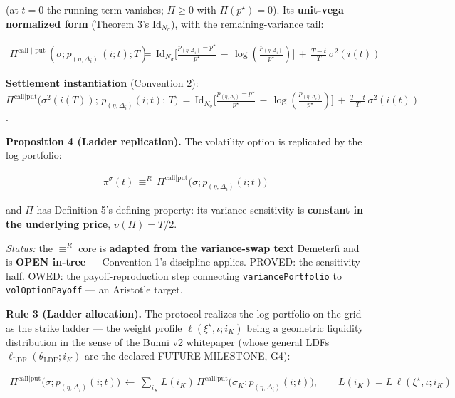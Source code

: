 \documentclass[11pt]{article}
\renewcommand{\_}{\textunderscore\allowbreak}
\begin{document}
(at \(t=0\) the running term vanishes; \(\Pi \geq 0\) with \(\Pi(p^{\star}) = 0\)). Its \textbf{unit-vega normalized form} (Theorem 3's \(\text{Id}_{N_\sigma}\)), with the remaining-variance tail:

\[
    \begin{aligned}
        \Pi^{\text{call | put}} \, (\sigma ;p_{(\eta, \Delta_i)} \, (i; t); T) \, &= \, \text{Id}_{ N_{\sigma}} \Big [\frac{p_{(\eta, \Delta_i)} - p^{\star}}{p^{\star}} \, - \, \log (\frac{p_{(\eta, \Delta_i)}}{p^{\star}})\Big] \, + \, \frac{T - t}{T}\, \sigma^2(i(t))
    \end{aligned}
\]

\textbf{Settlement instantiation} (Convention 2): \(\Pi^{\text{call|put}}\big(\sigma^2(i(T));\, p_{(\eta,\Delta_i)}(i;t);\, T\big) \, = \, \text{Id}_{ N_{\sigma}} \Big [\frac{p_{(\eta, \Delta_i)} - p^{\star}}{p^{\star}} \, - \, \log (\frac{p_{(\eta, \Delta_i)}}{p^{\star}})\Big] \, + \, \frac{T - t}{T}\, \sigma^2(i(t))\).

\textbf{Proposition 4 (Ladder replication).} The volatility option is replicated by the log portfolio:

\[
    \begin{aligned}
        \pi^{\sigma}(t) \, \equiv^{R} \, \Pi^{\text{call|put}}\big(\sigma; p_{(\eta,\Delta_i)}(i;t)\big)
    \end{aligned}
\]

and \(\Pi\) has Definition 5's defining property: its variance sensitivity is \textbf{constant in the underlying price}, \(\upsilon(\Pi) = T/2\).

\emph{Status:} the \(\equiv^R\) core is \textbf{adapted from the variance-swap text} \href{../refs/DemeterfietalVarianceSwaps.pdf}{Demeterfi} and is \textbf{OPEN in-tree} --- Convention 1's discipline applies. PROVED: the sensitivity half. OWED: the payoff-reproduction step connecting \texttt{variancePortfolio} to \texttt{volOptionPayoff} --- an Aristotle target.

\textbf{Rule 3 (Ladder allocation).} The protocol realizes the log portfolio on the grid as the strike ladder --- the weight profile \(\ell(\xi^{\star},\iota;i_K)\) being a geometric liquidity distribution in the sense of the \href{../refs/bunni-v2.pdf}{Bunni v2 whitepaper} (whose general LDFs \(\ell_{\text{LDF}}(\theta_{\text{LDF}};i_K)\) are the declared FUTURE MILESTONE, G4):

\[
    \begin{aligned}
        \Pi^{\text{call|put}}\big(\sigma; p_{(\eta,\Delta_i)}(i;t)\big) \, \leftarrow \, \sum_{i_K} L(i_K)\, \Pi^{\text{call|put}}\big(\sigma_K; p_{(\eta,\Delta_i)}(i;t)\big), \qquad L(i_K) = \bar L\,\ell(\xi^{\star},\iota; i_K)
    \end{aligned}
\]
\end{document}
